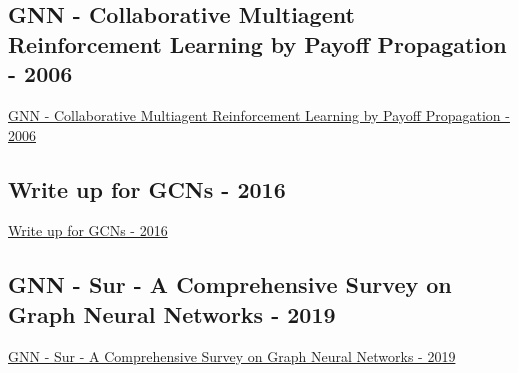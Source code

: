 \subsection{GNN - Collaborative Multiagent Reinforcement Learning by Payoff Propagation - 2006}
\href{https://dl.acm.org/doi/abs/10.5555/1248547.1248612}{GNN - Collaborative Multiagent Reinforcement Learning by Payoff Propagation - 2006}

\subsection{Write up for GCNs - 2016}
\href{https://tkipf.github.io/graph-convolutional-networks/}{Write up for GCNs - 2016}

\subsection{GNN - Sur - A Comprehensive Survey on Graph Neural Networks - 2019}
\href{https://arxiv.org/abs/1901.00596}{GNN - Sur - A Comprehensive Survey on Graph Neural Networks - 2019}
